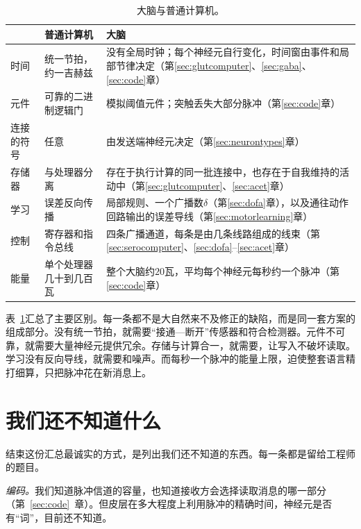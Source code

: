 \begin{table}[t]
\centering
\footnotesize
\setlength{\tabcolsep}{4pt}
\renewcommand{\arraystretch}{1.15}
\begin{tabular}{>{\raggedright}p{2.2cm}>{\raggedright}p{4.2cm}>{\raggedright\arraybackslash}p{6.6cm}}
\toprule
& 普通计算机 & 大脑 \\
\midrule
时间 & 统一节拍，约一吉赫兹 & 没有全局时钟；每个神经元自行变化，时间窗由事件和局部节律决定（第\ref{sec:glutcomputer}、\ref{sec:gaba}、\ref{sec:code}章） \\
元件 & 可靠的二进制逻辑门 & 模拟阈值元件；突触丢失大部分脉冲（第\ref{sec:code}章） \\
连接的符号 & 任意 & 由发送端神经元决定（第\ref{sec:neurontypes}章） \\
存储器 & 与处理器分离 & 存在于执行计算的同一批连接中，也存在于自我维持的活动中（第\ref{sec:glutcomputer}、\ref{sec:acet}章） \\
学习 & 误差反向传播 & 局部规则、一个广播数$\delta$（第\ref{sec:dofa}章），以及通往动作回路输出的误差导线（第\ref{sec:motorlearning}章） \\
控制 & 寄存器和指令总线 & 四条广播通道，每条是由几条线路组成的线束（第\ref{sec:serocomputer}、\ref{sec:dofa}--\ref{sec:acet}章） \\
能量 & 单个处理器几十到几百瓦 & 整个大脑约$20$瓦，平均每个神经元每秒约一个脉冲（第\ref{sec:code}章） \\
\bottomrule
\end{tabular}
\caption{大脑与普通计算机。}
\label{tab:computer}
\end{table}

表~\ref{tab:computer}汇总了主要区别。每一条都不是大自然来不及修正的缺陷，而是同一套方案的组成部分。没有统一节拍，就需要“接通—断开”传感器和符合检测器。元件不可靠，就需要大量神经元提供冗余。存储与计算合一，就需要，让写入不破坏读取。学习没有反向导线，就需要和噪声。而每秒一个脉冲的能量上限，迫使整套语言精打细算，只把脉冲花在新消息上。

\section{我们还不知道什么}

结束这份汇总最诚实的方式，是列出我们还不知道的东西。每一条都是留给工程师的题目。

\emph{编码。}我们知道脉冲信道的容量，也知道接收方会选择读取消息的哪一部分（第~\ref{sec:code}~章）。但皮层在多大程度上利用脉冲的精确时间，神经元是否有“词”，目前还不知道。

